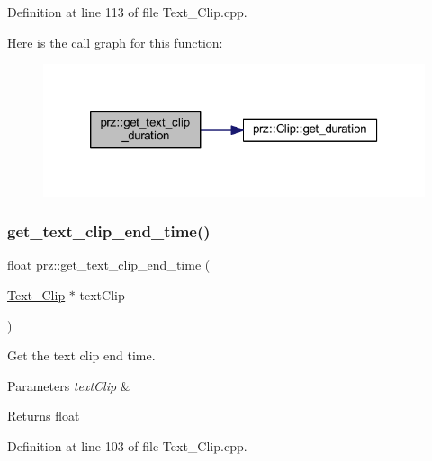 Definition at line 113 of file Text\+\_\+\+Clip.\+cpp.

Here is the call graph for this function\+:
\nopagebreak
\begin{figure}[H]
\begin{center}
\leavevmode
\includegraphics[width=320pt]{namespaceprz_af5b673ead16373948262d632b38d0343_cgraph}
\end{center}
\end{figure}
\mbox{\label{namespaceprz_a6c9111d61f5d8a4089c0dce9b8503f28}} 
\subsubsection{\texorpdfstring{get\_text\_clip\_end\_time()}{get\_text\_clip\_end\_time()}}
{\footnotesize\ttfamily float prz\+::get\+\_\+text\+\_\+clip\+\_\+end\+\_\+time (\begin{DoxyParamCaption}\item[{\mbox{\hyperlink{classprz_1_1_text___clip}{Text\+\_\+\+Clip}} $\ast$}]{text\+Clip }\end{DoxyParamCaption})}



Get the text clip end time. 


\begin{DoxyParams}{Parameters}
{\em text\+Clip} & \\
\hline
\end{DoxyParams}
\begin{DoxyReturn}{Returns}
float 
\end{DoxyReturn}


Definition at line 103 of file Text\+\_\+\+Clip.\+cpp.

